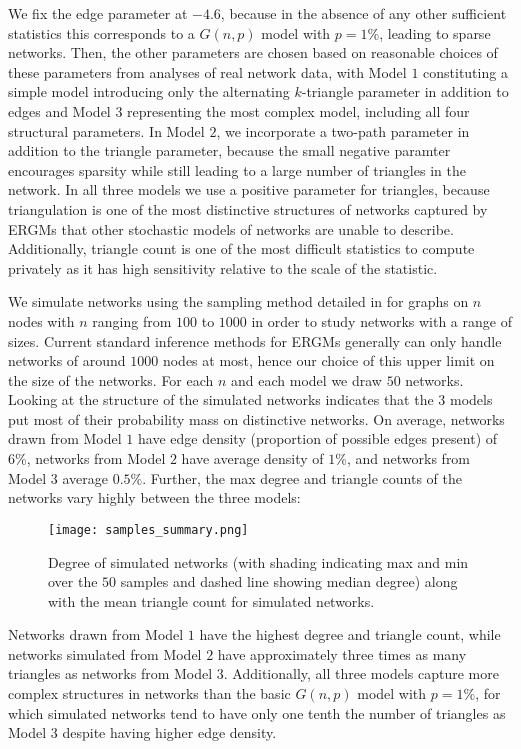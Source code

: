  	 We fix the edge parameter at $-4.6$, because in the absence of any other sufficient statistics this corresponds to a $G(n,p)$ model with $p = 1\%$, leading to sparse networks. Then, the other parameters are chosen based on reasonable choices of these parameters from analyses of real network data, with Model $1$ constituting a simple model introducing only the alternating $k$-triangle parameter in addition to edges and Model $3$ representing the most complex model, including all four structural parameters. In Model $2$, we incorporate a two-path parameter in addition to the triangle parameter, because the small negative paramter encourages sparsity while still leading to a large number of triangles in the network. In all three models we use a positive parameter for triangles, because triangulation is one of the most distinctive structures of networks captured by ERGMs that other stochastic models of networks are unable to describe. Additionally, triangle count is one of the most difficult statistics to compute privately as it has high sensitivity relative to the scale of the statistic. 
 	 
 	We simulate networks using the sampling method detailed in  for graphs on $n$ nodes with $n$ ranging from $100$ to $1000$ in order to study networks with a range of sizes. Current standard inference methods for ERGMs generally can only handle networks of around $1000$ nodes at most, hence our choice of this upper limit on the size of the networks. For each $n$ and each model we draw $50$ networks. Looking at the structure of the simulated networks indicates that the $3$ models put most of their probability mass on distinctive networks. On average, networks drawn from Model $1$  have edge density (proportion of possible edges present) of $6\%$, networks from Model $2$ have average density of $1\%$, and networks from Model $3$ average $0.5\%$.  Further, the max degree and triangle counts of the networks vary highly between the three models:
 	
 	\begin{figure}[!h]
 		\centering
 		\texttt{[image: samples\_summary.png]}
 		\caption{Degree of simulated networks (with shading indicating max and min over the $50$ samples and dashed line showing median degree) along with the mean triangle count for simulated networks.}
 	\end{figure}
 
 	 Networks drawn from Model $1$ have the highest degree and triangle count, while networks simulated from Model $2$ have approximately three times as many triangles as networks from Model $3$. Additionally, all three models capture more complex structures in networks than the basic $G(n,p)$ model with $p = 1\%$, for which simulated networks tend to have only one tenth the number of triangles as Model $3$ despite having higher edge density.  
 	
